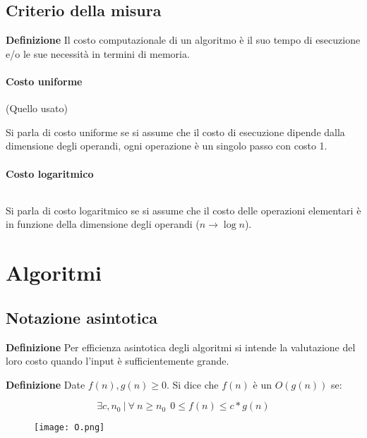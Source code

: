 \documentclass{article}
\begin{document}
\subsection{Criterio della misura}

\textbf{Definizione} Il costo computazionale di un algoritmo è il suo tempo di esecuzione e/o le sue necessità in termini di memoria.

\paragraph{Costo uniforme}(Quello usato)\newline

\noindent Si parla di costo uniforme se si assume che
il costo di esecuzione dipende dalla dimensione degli operandi, ogni operazione è un singolo passo con costo 1.

\paragraph{Costo logaritmico}$\ $\newline

\noindent Si parla di costo logaritmico se si assume che il costo delle operazioni elementari è in funzione della dimensione degli operandi ($n\rightarrow \log n$).

\newpage

\section{Algoritmi}

\subsection{Notazione asintotica}

\textbf{Definizione} Per efficienza asintotica degli algoritmi si intende la valutazione del loro costo quando l'input è sufficientemente grande.\newline

\noindent\textbf{Definizione} Date $f(n),g(n)\geq 0$. Si dice che $f(n)$ è un $O(g(n))$ se:

$$\exists c,n_0\ |\ \forall\ n\geq n_0\ \ 0\leq f(n)\leq c*g(n)$$\newline

\begin{figure}[ht]
    \centering
    \texttt{[image: O.png]}
    \label{fig:O}
\end{figure}
\end{document}
